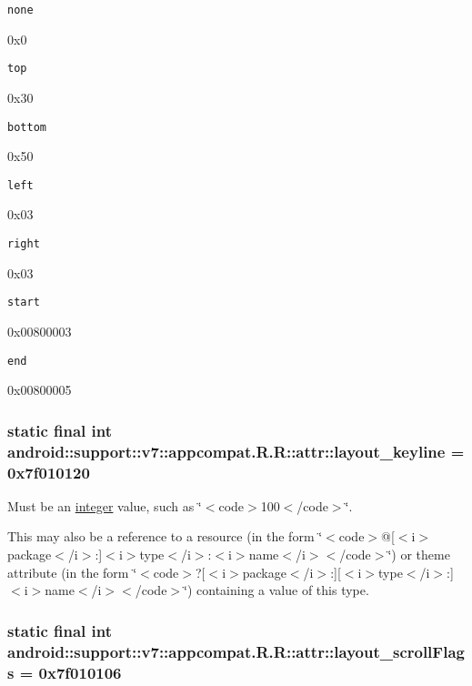 {\tt none}

0x0

{\tt top}

0x30

{\tt bottom}

0x50

{\tt left}

0x03

{\tt right}

0x03

{\tt start}

0x00800003

{\tt end}

0x00800005\hypertarget{classandroid_1_1support_1_1v7_1_1appcompat_1_1_r_1_1attr_116afb9eb785e88b06909ddc35d84370}{
\subsubsection[{layout\_\-keyline}]{\setlength{\rightskip}{0pt plus 5cm}static final int android::support::v7::appcompat.R.R::attr::layout\_\-keyline = 0x7f010120}}
\label{classandroid_1_1support_1_1v7_1_1appcompat_1_1_r_1_1attr_116afb9eb785e88b06909ddc35d84370}


Must be an \hyperlink{classandroid_1_1support_1_1v7_1_1appcompat_1_1_r_1_1integer}{integer} value, such as \char`\"{}$<$code$>$100$<$/code$>$\char`\"{}. 

This may also be a reference to a resource (in the form \char`\"{}$<$code$>$@\mbox{[}$<$i$>$package$<$/i$>$:\mbox{]}$<$i$>$type$<$/i$>$:$<$i$>$name$<$/i$>$$<$/code$>$\char`\"{}) or theme attribute (in the form \char`\"{}$<$code$>$?\mbox{[}$<$i$>$package$<$/i$>$:\mbox{]}\mbox{[}$<$i$>$type$<$/i$>$:\mbox{]}$<$i$>$name$<$/i$>$$<$/code$>$\char`\"{}) containing a value of this type. \hypertarget{classandroid_1_1support_1_1v7_1_1appcompat_1_1_r_1_1attr_0b0bb37b2387eae73cd1d1f2ca74c9fe}{
\subsubsection[{layout\_\-scrollFlags}]{\setlength{\rightskip}{0pt plus 5cm}static final int android::support::v7::appcompat.R.R::attr::layout\_\-scrollFlags = 0x7f010106}}
\label{classandroid_1_1support_1_1v7_1_1appcompat_1_1_r_1_1attr_0b0bb37b2387eae73cd1d1f2ca74c9fe}


